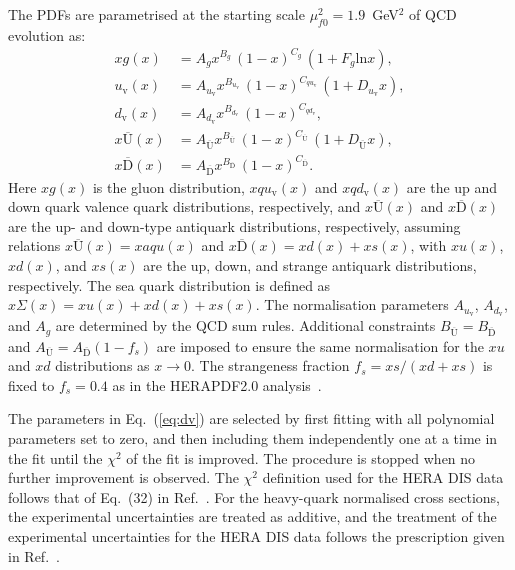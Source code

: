 \documentclass[12pt]{article}
\begin{document}
The PDFs are parametrised at the starting scale $\mu^2_{f0} = 1.9$~GeV$^2$ of QCD evolution as:
\begin{equation}\begin{aligned}
xg(x) &= A_{g} x^{B_{g}}\,(1-x)^{C_{g}}\, (1 + F_{g} {\textrm{ln} x}),\\
u_\mathrm{v}(x) &= A_{u_\mathrm{v}}x^{B_{u_\mathrm{v}}}\,(1-x)^{C_{qu_\mathrm{v}}}\,(1+D_{u_\mathrm{v}}x) ,\\
d_\mathrm{v}(x) &= A_{d_\mathrm{v}}x^{B_{d_\mathrm{v}}}\,(1-x)^{C_{qd_\mathrm{v}}},\\
x\overline{\mathrm{U}}(x)&= A_{\overline{\mathrm{U}}}x^{B_{\overline{\mathrm{U}}}}\, (1-x)^{C_{\overline{\mathrm{U}}}}\, (1+D_{\overline{\mathrm{U}}}x), \\
x\overline{\mathrm{D}}(x)&= A_{\overline{\mathrm{D}}}x^{B_{\overline{\mathrm{D}}}}\, (1-x)^{C_{\overline{\mathrm{D}}}}.
\end{aligned}
\label{eq:dv}
\end{equation}
Here $xg(x)$ is the gluon distribution, $xqu_{\mathrm{v}}(x)$ and $xqd_{\mathrm{v}}(x)$ are the up and down quark valence quark distributions, respectively, and $x\overline{\mathrm{U}}(x)$ and $x\overline{\mathrm{D}}(x)$ are 
the up- and down-type antiquark distributions, respectively, assuming relations $x\overline{\mathrm{U}}(x) = xaqu(x)$ and $x\overline{\mathrm{D}}(x) = xd(x) + xs(x)$, with $xu(x)$, $xd(x)$, and $xs(x)$ are the up, down, and strange antiquark distributions, respectively.
The sea quark distribution is defined as $x\Sigma(x)=xu(x)+xd(x)+xs(x)$.
The normalisation parameters $A_{u_{\mathrm{v}}}$, $A_{d_\mathrm{v}}$, and $A_{g}$ are determined by the QCD sum rules.
Additional constraints $B_{\overline{\mathrm{U}}} = B_{\overline{\mathrm{D}}}$ and
$A_{\overline{\mathrm{U}}} = A_{\overline{\mathrm{D}}}(1 - f_{s})$ are imposed to ensure the same normalisation
for the $xu$ and $xd$ distributions as $x \to 0$.
The strangeness fraction $f_{s} = xs/( xd + xs)$ is fixed to
$f_{s}=0.4$ as in the HERAPDF2.0 analysis~\cite{Abramowicz:2015mha}.

The parameters in Eq.~(\ref{eq:dv}) are selected by first fitting with all polynomial parameters set to zero,
and then including them independently one at a time in the fit until the $\chi^2$ of the fit is improved.
The procedure is stopped when no further improvement is observed.
The $\chi^2$ definition used for the HERA DIS data follows that of Eq.~(32) in Ref.~\cite{Abramowicz:2015mha}.
For the heavy-quark normalised cross sections, the experimental uncertainties are treated as additive, and the treatment of the experimental uncertainties for the HERA DIS data follows the prescription given in Ref.~\cite{Abramowicz:2015mha}.
\end{document}
